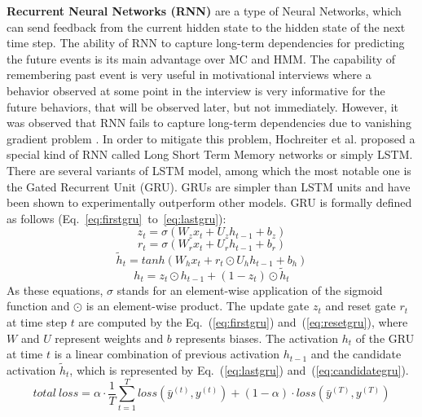 \documentclass{amia_summit_2018}
\begin{document}
\textbf {Recurrent Neural Networks (RNN)} are a type of Neural Networks, which can send feedback from the current hidden state to the hidden state of the next time step. The ability of RNN to capture
long-term dependencies for predicting the future events is its main advantage over MC and HMM. The capability of remembering past event is very useful in motivational interviews where a behavior
observed at some point in the interview is very informative for the future behaviors, that will be observed later, but not immediately. However, it was observed that RNN fails to capture long-term
dependencies due to vanishing gradient problem \cite{bengio1993problem}. In order to mitigate this problem, Hochreiter et al.\cite{hochreiter1997long} proposed a special kind of RNN called Long Short
Term Memory networks or simply LSTM. There are several variants of LSTM model, among which the most notable one is the Gated Recurrent Unit\cite{cho2014properties} (GRU). GRUs are
simpler than LSTM units and have been shown to experimentally outperform other models\cite{cho2014properties}. GRU is formally defined as follows (Eq.~\ref{eq:firstgru}~to~\ref{eq:lastgru}):
\begin{equation}
z_t = \sigma(W_zx_t + U_zh_{t-1} + b_z)
\label{eq:firstgru}
\end{equation}
\begin{equation}
r_t = \sigma(W_rx_t + U_rh_{t-1} + b_r)
\label{eq:resetgru}
\end{equation}
\begin{equation}
\tilde h_t = tanh(W_hx_t + r_t \odot U_hh_{t-1} + b_h) 
\label{eq:candidategru}
\end{equation}
\begin{equation}
h_t = z_t \odot h_{t-1} + (1-z_t) \odot \tilde h_t
\label{eq:lastgru}
\end{equation}  
As these equations, $\sigma$ stands for an element-wise application of the sigmoid function and $\odot$ is an element-wise product. The update gate $z_t$ and reset gate $r_t$ at time step $t$ are computed by the Eq.~(\ref{eq:firstgru}) and~(\ref{eq:resetgru}), where $W$ and $U$ represent weights and $b$ represents biases. The activation $h_t$ of the GRU at time $t$ is a linear combination of previous activation $h_{t-1}$ and the candidate activation $\tilde h_t$, which is represented by Eq.~(\ref{eq:lastgru}) and~(\ref{eq:candidategru}).
\begin{equation}
total\ loss = \alpha \cdot \frac{1}{T}\sum_{t=1}^T loss(\bar y^{(t)},y^{(t)}) + (1 - \alpha) \cdot loss(\bar y^{(T)},y^{(T)})
\label{eq:loss}
\end{equation}  
\end{document}
